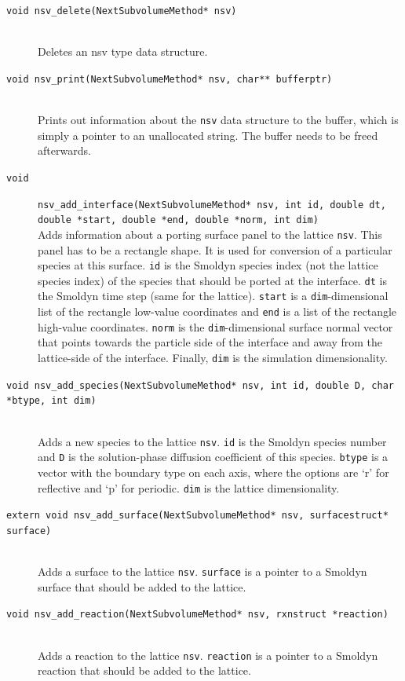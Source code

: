 \documentclass {scrbook}
\newcommand {\ttt} {\texttt}
\begin{document}
\begin{description}
\item[\ttt{void nsv\_delete(NextSubvolumeMethod* nsv)}]
\hfill \\
Deletes an nsv type data structure.

\item[\ttt{void nsv\_print(NextSubvolumeMethod* nsv, char** bufferptr)}]
\hfill \\
Prints out information about the \ttt{nsv} data structure to the buffer, which is simply a pointer to an unallocated string. The buffer needs to be freed afterwards.

\item[\ttt{void}]
\ttt{nsv\_add\_interface(NextSubvolumeMethod* nsv, int id, double dt, double *start, double *end, double *norm, int dim)}
\hfill \\
Adds information about a porting surface panel to the lattice \ttt{nsv}. This panel has to be a rectangle shape. It is used for conversion of a particular species at this surface. \ttt{id} is the Smoldyn species index (not the lattice species index) of the species that should be ported at the interface. \ttt{dt} is the Smoldyn time step (same for the lattice). \ttt{start} is a \ttt{dim}-dimensional list of the rectangle low-value coordinates and \ttt{end} is a list of the rectangle high-value coordinates. \ttt{norm} is the \ttt{dim}-dimensional surface normal vector that points towards the particle side of the interface and away from the lattice-side of the interface. Finally, \ttt{dim} is the simulation dimensionality.

\item[\ttt{void nsv\_add\_species(NextSubvolumeMethod* nsv, int id, double D, char *btype, int dim)}]
\hfill \\
Adds a new species to the lattice \ttt{nsv}. \ttt{id} is the Smoldyn species number and \ttt{D} is the solution-phase diffusion coefficient of this species. \ttt{btype} is a vector with the boundary type on each axis, where the options are `r' for reflective and `p' for periodic. \ttt{dim} is the lattice dimensionality.

\item[\ttt{extern void nsv\_add\_surface(NextSubvolumeMethod* nsv, surfacestruct* surface)}]
\hfill \\
Adds a surface to the lattice \ttt{nsv}. \ttt{surface} is a pointer to a Smoldyn surface that should be added to the lattice.

\item[\ttt{void nsv\_add\_reaction(NextSubvolumeMethod* nsv, rxnstruct *reaction)}]
\hfill \\
Adds a reaction to the lattice \ttt{nsv}. \ttt{reaction} is a pointer to a Smoldyn reaction that should be added to the lattice.


\end{description}
\end{document}
